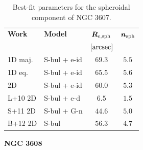\documentclass[preprint2]{emulateapj}
\begin{document}
  \begin{table}[h]
  \small
  \caption{Best-fit parameters for the spheroidal component of NGC 3607.}
  \begin{center}
  \begin{tabular}{llcc}
  \hline
  {\bf Work} & {\bf Model}   & $\bm R_{\rm e,sph}$    & $\bm n_{\rm sph}$ \\
    &  &  $[\rm arcsec]$ & \\
  \hline
  1D maj. & S-bul + e-id & $69.3$  &  $5.5$ \\
  1D eq.  & S-bul + e-id & $65.5$  &  $5.6$ \\
  2D      & S-bul + e-id & $60.0$  &  $5.3$ \\
  \hline
  L+10 2D	   & S-bul + e-d      & $6.5$   &  $1.5$ \\
  S+11 2D	   & S-bul + G-n      & $44.6$  &  $5.0$ \\
  B+12 2D	   & S-bul	      & $56.3$  &  $4.7$ \\
  \hline
  \end{tabular}
  \end{center}
  \label{tab:n3607}
  \end{table}

  \clearpage\newpage\noindent

  {\bf NGC 3608 \\}
\end{document}
